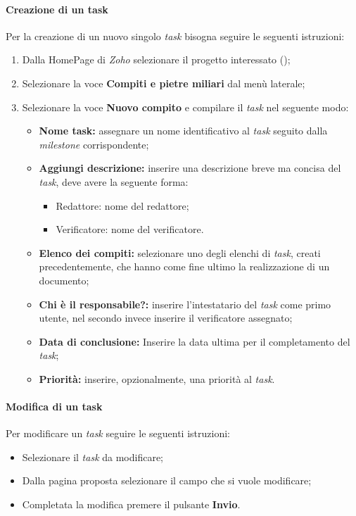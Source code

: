 \paragraph{Creazione di un task}
Per la creazione di un nuovo singolo \textit{task} bisogna seguire le seguenti
istruzioni:
\begin{enumerate}
  \item Dalla HomePage di \textit{Zoho} selezionare il progetto interessato (\progetto);
  \item Selezionare la voce \textbf{Compiti e pietre miliari} dal menù laterale;
  \item Selezionare la voce \textbf{Nuovo compito} e compilare il \textit{task} nel
  seguente modo:
    \begin{itemize}
      \item \textbf{Nome task:} assegnare un nome identificativo al \textit{task} seguito dalla \textit{milestone} corrispondente;
      \item \textbf{Aggiungi descrizione:} inserire una descrizione breve ma
      concisa del \textit{task}, deve avere la seguente forma:
        \begin{itemize}
          \item Redattore: nome del redattore;
          \item Verificatore: nome del verificatore.
        \end{itemize}
      \item \textbf{Elenco dei compiti:} selezionare uno degli elenchi di
      \textit{task}, creati precedentemente, che hanno come fine ultimo la realizzazione di un
      documento;
      \item \textbf{Chi è il responsabile?:} inserire l'intestatario del \textit{task}
      come primo utente, nel secondo invece inserire il verificatore assegnato;
      \item \textbf{Data di conclusione:} Inserire la data ultima per il
      completamento del \textit{task};
     \item \textbf{Priorità:} inserire, opzionalmente, una priorità al \textit{task}.
    \end{itemize}
\end{enumerate}


\paragraph{Modifica di un task}
Per modificare un \textit{task} seguire le seguenti istruzioni:
\begin{itemize}
  \item Selezionare il \textit{task} da modificare;
  \item Dalla pagina proposta selezionare il campo che si vuole modificare;
  \item Completata la modifica premere il pulsante \textbf{Invio}.
\end{itemize}

